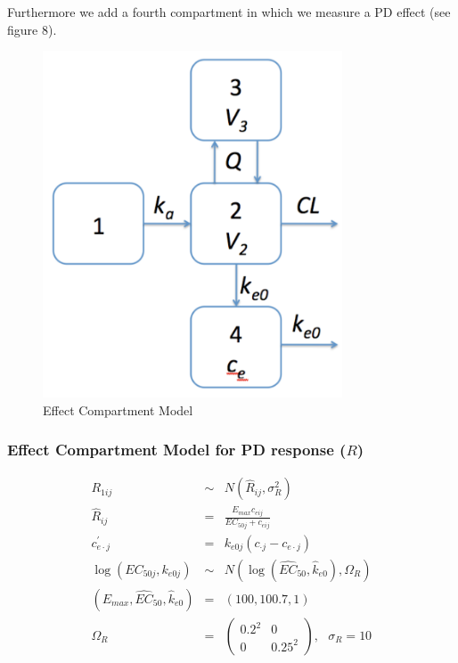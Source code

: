 \documentclass[11pt]{amsart}
\begin{document}
Furthermore we add a fourth compartment in which we measure a PD effect (see figure 8).

\begin{figure}[htbp]
\includegraphics[width=3.5in,trim=0in 0in 0 0in]{graphics/effectCptModel.pdf}
\caption{Effect Compartment Model}
\label{effCptModel}
\end{figure}

\subsubsection*{Effect Compartment Model for PD response ($R$)}
\begin{eqnarray*}
R_{1ij} &\sim& N\left(\widehat{R}_{ij},\sigma_{R}^2\right) \\
\widehat{R}_{ij} &=& \frac{E_{max}c_{eij}}{EC_{50j} + c_{eij}} \\
c_{e\cdot j}^\prime &=& k_{e0j}\left(c_{\cdot j} - c_{e\cdot j}\right) \\
\log\left(EC_{50j}, k_{e0j}\right) &\sim& N\left(\log\left(\widehat{EC}_{50}, \widehat{k}_{e0}\right),\Omega_R\right) \\
\left(E_{max}, \widehat{EC}_{50},\widehat{k}_{e0}\right) &=& \left(100, 100.7, 1\right) \\
\Omega_R &=& \left(\begin{array}{cc} 0.2^2 & 0 \\ 0 & 0.25^2  \end{array}\right), \ \ \ \sigma_R = 10
\end{eqnarray*}
\end{document}
